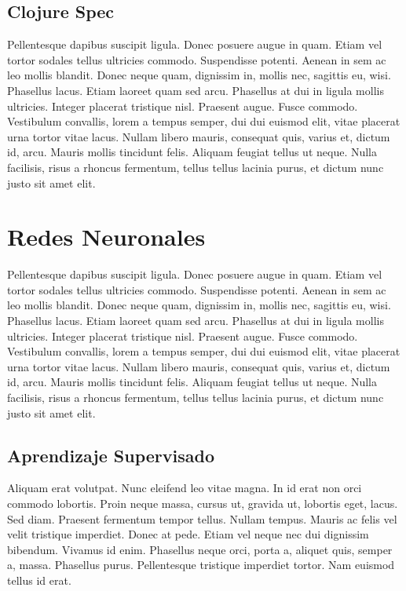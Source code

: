\subsection{Clojure Spec}

Pellentesque dapibus suscipit ligula.  Donec posuere augue in quam.
Etiam vel tortor sodales tellus ultricies commodo.  Suspendisse
potenti.  Aenean in sem ac leo mollis blandit.  Donec neque quam,
dignissim in, mollis nec, sagittis eu, wisi.  Phasellus lacus.  Etiam
laoreet quam sed arcu.  Phasellus at dui in ligula mollis ultricies.
Integer placerat tristique nisl.  Praesent augue.  Fusce commodo.
Vestibulum convallis, lorem a tempus semper, dui dui euismod elit,
vitae placerat urna tortor vitae lacus.  Nullam libero mauris,
consequat quis, varius et, dictum id, arcu.  Mauris mollis tincidunt
felis.  Aliquam feugiat tellus ut neque.  Nulla facilisis, risus a
rhoncus fermentum, tellus tellus lacinia purus, et dictum nunc justo
sit amet elit.

\section{Redes Neuronales}

Pellentesque dapibus suscipit ligula.  Donec posuere augue in quam.
Etiam vel tortor sodales tellus ultricies commodo.  Suspendisse
potenti.  Aenean in sem ac leo mollis blandit.  Donec neque quam,
dignissim in, mollis nec, sagittis eu, wisi.  Phasellus lacus.  Etiam
laoreet quam sed arcu.  Phasellus at dui in ligula mollis ultricies.
Integer placerat tristique nisl.  Praesent augue.  Fusce commodo.
Vestibulum convallis, lorem a tempus semper, dui dui euismod elit,
vitae placerat urna tortor vitae lacus.  Nullam libero mauris,
consequat quis, varius et, dictum id, arcu.  Mauris mollis tincidunt
felis.  Aliquam feugiat tellus ut neque.  Nulla facilisis, risus a
rhoncus fermentum, tellus tellus lacinia purus, et dictum nunc justo
sit amet elit.

\subsection{Aprendizaje Supervisado}

Aliquam erat volutpat.  Nunc eleifend leo vitae magna.  In id erat non
orci commodo lobortis.  Proin neque massa, cursus ut, gravida ut,
lobortis eget, lacus.  Sed diam.  Praesent fermentum tempor tellus.
Nullam tempus.  Mauris ac felis vel velit tristique imperdiet.  Donec
at pede.  Etiam vel neque nec dui dignissim bibendum.  Vivamus id
enim.  Phasellus neque orci, porta a, aliquet quis, semper a, massa.
Phasellus purus.  Pellentesque tristique imperdiet tortor.  Nam
euismod tellus id erat.

